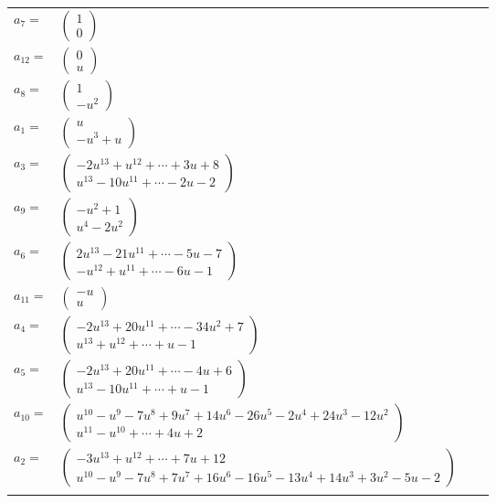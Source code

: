 \documentclass[1p]{elsarticle_modified}
\theoremstyle{definition}
\begin{document}
\begin{tabular}{m{7pt} m{180pt} m{7pt} m{180pt} }
\flushright $a_{7}=$&$\begin{pmatrix}1\\0\end{pmatrix}$ \\
\flushright $a_{12}=$&$\begin{pmatrix}0\\u\end{pmatrix}$ \\
\flushright $a_{8}=$&$\begin{pmatrix}1\\- u^2\end{pmatrix}$ \\
\flushright $a_{1}=$&$\begin{pmatrix}u\\- u^3+u\end{pmatrix}$ \\
\flushright $a_{3}=$&$\begin{pmatrix}-2 u^{13}+u^{12}+\cdots+3 u+8\\u^{13}-10 u^{11}+\cdots-2 u-2\end{pmatrix}$ \\
\flushright $a_{9}=$&$\begin{pmatrix}- u^2+1\\u^4-2 u^2\end{pmatrix}$ \\
\flushright $a_{6}=$&$\begin{pmatrix}2 u^{13}-21 u^{11}+\cdots-5 u-7\\- u^{12}+u^{11}+\cdots-6 u-1\end{pmatrix}$ \\
\flushright $a_{11}=$&$\begin{pmatrix}- u\\u\end{pmatrix}$ \\
\flushright $a_{4}=$&$\begin{pmatrix}-2 u^{13}+20 u^{11}+\cdots-34 u^2+7\\u^{13}+u^{12}+\cdots+u-1\end{pmatrix}$ \\
\flushright $a_{5}=$&$\begin{pmatrix}-2 u^{13}+20 u^{11}+\cdots-4 u+6\\u^{13}-10 u^{11}+\cdots+u-1\end{pmatrix}$ \\
\flushright $a_{10}=$&$\begin{pmatrix}u^{10}- u^9-7 u^8+9 u^7+14 u^6-26 u^5-2 u^4+24 u^3-12 u^2\\u^{11}- u^{10}+\cdots+4 u+2\end{pmatrix}$ \\
\flushright $a_{2}=$&$\begin{pmatrix}-3 u^{13}+u^{12}+\cdots+7 u+12\\u^{10}- u^9-7 u^8+7 u^7+16 u^6-16 u^5-13 u^4+14 u^3+3 u^2-5 u-2\end{pmatrix}$\\&\end{tabular}
\end{document}
